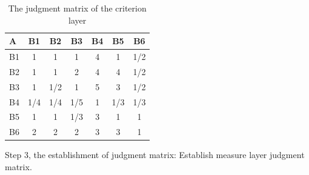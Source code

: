 \begin{table}[h-ere]
	\centering%
	\begin{tabular}{lcccccc}  %
		\hline
		A & B1 & B2   & B3 & B4 & B5 & B6\\ \hline  %
		B1   & 1    & 1    & 1    & 4   & 1 & 1/2  \\      
		B2   & 1    & 1    & 2    & 4   & 4 & 1/2  \\   
		B3   & 1    & 1/2  & 1    & 5   & 3 & 1/2  \\   
		B4   & 1/4  & 1/4  & 1/5  & 1   & 1/3 & 1/3  \\   
		B5   & 1    & 1    & 1/3    & 3 & 1 & 1  \\   
		B6   & 2    & 2    & 2    & 3   & 3 & 1  \\       
		\hline
	\end{tabular}
	\caption{The judgment matrix of the criterion layer}\label{tab:3}
\end{table} 
	\par Step 3, the establishment of judgment matrix:
	Establish measure layer judgment matrix.
	
